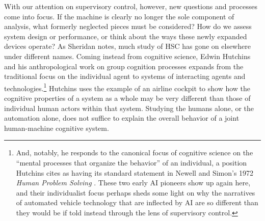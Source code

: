 With our attention on supervisory control, however, new questions and processes
come into focus. If the machine is clearly no
longer the sole component of analysis, what formerly neglected pieces
must be considered? How do we assess system design or performance, or
think about the ways these newly expanded devices operate? As Sheridan notes, much study of
HSC has gone on elsewhere under different names. Coming instead from cognitive
science, Edwin Hutchins and his anthropological work on group cognition
processes expands from the traditional focus on the individual agent
to systems of interacting agents and technologies.\footnote{And, notably, he responds to the canonical focus of
  cognitive science on the ``mental processes that organize the
  behavior'' of an individual, a position Hutchins cites as having its
standard statement in Newell and Simon's 1972 \emph{Human Problem
  Solving} \cite[p. 265-266]{hutchinsCockpit}. These two early AI pioneers show
up again here, and their individualist focus perhaps sheds some 
light on why the narratives of automated vehicle technology that are
inflected by AI are so different than they would be if told instead
through the lens of supervisory control.}
Hutchins uses the example of an airline cockpit \cite{hutchinsCockpit} to show how the cognitive
properties of a system as a whole may be very different than those of
individual human actors within that system. Studying the humans alone,
or the automation alone, does not suffice to explain the overall
behavior of a joint human-machine cognitive system.




